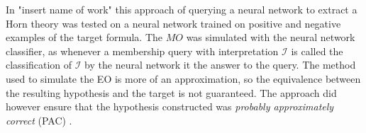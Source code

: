 In "insert name of work" this approach of querying a neural network to extract a Horn theory was tested on a neural network trained on positive and negative examples of the target formula. The $MO$ was simulated with the neural network classifier, as whenever a membership query with interpretation $\mathcal{I}$ is called the classification of $\mathcal{I}$ by the neural network it the answer to the query. The method used to simulate the EO is more of an approximation, so the equivalence between the resulting hypothesis and the target is not guaranteed. The approach did however ensure that  the hypothesis constructed was \emph{probably approximately correct} (PAC) \cite{Valiant}.